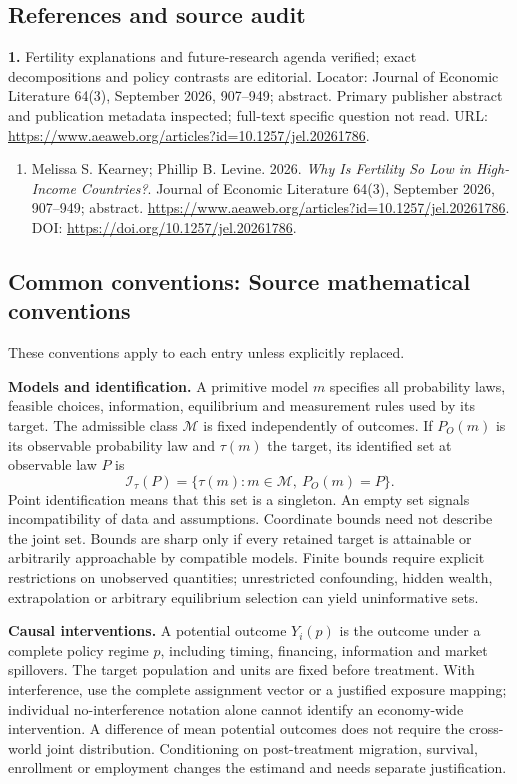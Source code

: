 \documentclass[11pt,a4paper]{article}
\begin{document}
\subsection*{References and source audit}
\textbf{1.} Fertility explanations and future-research agenda verified; exact decompositions and policy contrasts are editorial. Locator: Journal of Economic Literature 64(3), September 2026, 907–949; abstract. Primary publisher abstract and publication metadata inspected; full-text specific question not read. URL: \url{https://www.aeaweb.org/articles?id=10.1257/jel.20261786}.
\begin{enumerate}\raggedright
\item\hypertarget{definitions:source:30007737:1}{} Melissa S. Kearney; Phillip B. Levine. 2026. \emph{Why Is Fertility So Low in High-Income Countries?}. Journal of Economic Literature 64(3), September 2026, 907–949; abstract.
\url{https://www.aeaweb.org/articles?id=10.1257/jel.20261786}.
DOI: \url{https://doi.org/10.1257/jel.20261786}.
\end{enumerate}

\subsection*{Common conventions: Source mathematical conventions}

These conventions apply to each entry unless explicitly replaced.

\textbf{Models and identification.} A primitive model \(m\) specifies all probability laws, feasible choices, information, equilibrium and measurement rules used by its target. The admissible class \(\mathcal M\) is fixed independently of outcomes. If \(P_O(m)\) is its observable probability law and \(\tau(m)\) the target, its identified set at observable law \(P\) is
\[
 \mathcal I_\tau(P)=\{\tau(m):m\in\mathcal M,\ P_O(m)=P\}.
\]
Point identification means that this set is a singleton. An empty set signals incompatibility of data and assumptions. Coordinate bounds need not describe the joint set. Bounds are sharp only if every retained target is attainable or arbitrarily approachable by compatible models. Finite bounds require explicit restrictions on unobserved quantities; unrestricted confounding, hidden wealth, extrapolation or arbitrary equilibrium selection can yield uninformative sets.

\textbf{Causal interventions.} A potential outcome \(Y_i(p)\) is the outcome under a complete policy regime \(p\), including timing, financing, information and market spillovers. The target population and units are fixed before treatment. With interference, use the complete assignment vector or a justified exposure mapping; individual no-interference notation alone cannot identify an economy-wide intervention. A difference of mean potential outcomes does not require the cross-world joint distribution. Conditioning on post-treatment migration, survival, enrollment or employment changes the estimand and needs separate justification.
\end{document}
